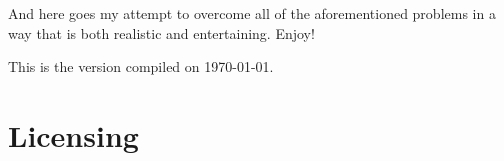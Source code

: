 And here goes my attempt to overcome all of the aforementioned problems in a way that is both realistic and entertaining. Enjoy!

This is the version compiled on \today.

\section*{Licensing}

\pdforepub{
	
\doclicenseThis

\hspace*{\fill} \qrcode[nolink,level=L,height=3cm]{\doclicenseURL}

}{\doclicenseLongText}